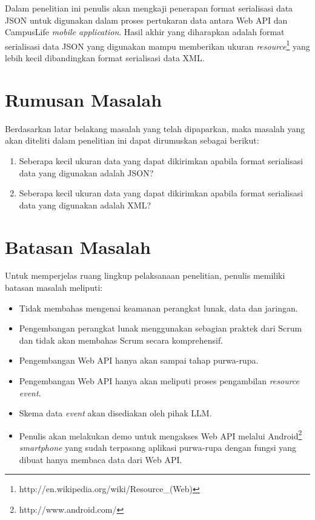 \documentclass[a4paper, 12pt]{report}
\begin{document}
\onehalfspacing Dalam penelitian ini penulis akan mengkaji penerapan format serialisasi data JSON untuk digunakan dalam proses pertukaran data antara Web API dan CampusLife \textit{mobile application}. Hasil akhir yang diharapkan adalah format serialisasi data JSON yang digunakan mampu memberikan ukuran \textit{resource}\footnote{http://en.wikipedia.org/wiki/Resource\_(Web)} yang lebih kecil dibandingkan format serialisasi data XML.\cite{json-fat-free}

\section*{Rumusan Masalah}
\onehalfspacing Berdasarkan latar belakang masalah yang telah dipaparkan, maka masalah yang akan diteliti dalam penelitian ini dapat dirumuskan sebagai berikut:
\begin{enumerate}
  \item Seberapa kecil ukuran data yang dapat dikirimkan apabila format serialisasi data yang digunakan adalah JSON?
  \item Seberapa kecil ukuran data yang dapat dikirimkan apabila format serialisasi data yang digunakan adalah XML?
\end{enumerate}

\section*{Batasan Masalah}
\onehalfspacing Untuk memperjelas ruang lingkup pelaksanaan penelitian, penulis memiliki batasan masalah meliputi:
\onehalfspacing
\begin{itemize}
  \item Tidak membahas mengenai keamanan perangkat lunak, data dan jaringan.
  \item Pengembangan perangkat lunak menggunakan sebagian praktek dari Scrum dan tidak akan membahas Scrum secara komprehensif.
  \item Pengembangan Web API hanya akan sampai tahap purwa-rupa.
  \item Pengembangan Web API hanya akan meliputi proses pengambilan \textit{resource} \textit{event}.
  \item Skema data \textit{event} akan disediakan oleh pihak LLM.
  \item Penulis akan melakukan demo untuk mengakses Web API melalui Android\footnote{http://www.android.com/} \textit{smartphone} yang sudah terpasang aplikasi purwa-rupa dengan fungsi yang dibuat hanya membaca data dari Web API.
\end{itemize}
\end{document}

